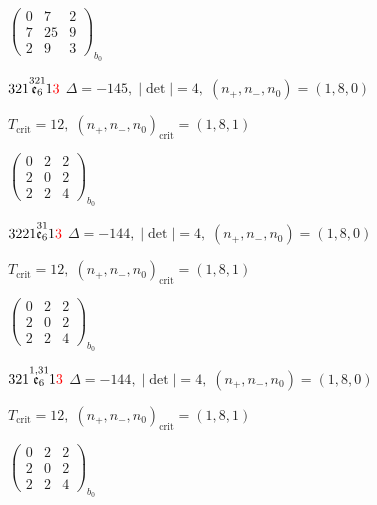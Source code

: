 \documentclass[10pt]{article}
\begin{document}
\hspace{2em}$\left(\begin{smallmatrix}0 & 7 & 2 \\ 7 & 25 & 9 \\ 2 & 9 & 3\end{smallmatrix}\right)_{\!b_0}$

\smallskip

$321\overset{321}{\mathfrak{e}_6}1\textcolor{red}{3}$ \quad $\Delta=-145,\; |\det|=4,\; (n_+,n_-,n_0)=(1,8,0)$

\hspace{1em}$T_{\text{crit}}=12,\; (n_+,n_-,n_0)_{\text{crit}}=(1,8,1)$

\hspace{2em}$\left(\begin{smallmatrix}0 & 2 & 2 \\ 2 & 0 & 2 \\ 2 & 2 & 4\end{smallmatrix}\right)_{\!b_0}$

\smallskip

$3221\overset{31}{\mathfrak{e}_6}1\textcolor{red}{3}$ \quad $\Delta=-144,\; |\det|=4,\; (n_+,n_-,n_0)=(1,8,0)$

\hspace{1em}$T_{\text{crit}}=12,\; (n_+,n_-,n_0)_{\text{crit}}=(1,8,1)$

\hspace{2em}$\left(\begin{smallmatrix}0 & 2 & 2 \\ 2 & 0 & 2 \\ 2 & 2 & 4\end{smallmatrix}\right)_{\!b_0}$

\smallskip

$321\overset{1,31}{\mathfrak{e}_6}1\textcolor{red}{3}$ \quad $\Delta=-144,\; |\det|=4,\; (n_+,n_-,n_0)=(1,8,0)$

\hspace{1em}$T_{\text{crit}}=12,\; (n_+,n_-,n_0)_{\text{crit}}=(1,8,1)$

\hspace{2em}$\left(\begin{smallmatrix}0 & 2 & 2 \\ 2 & 0 & 2 \\ 2 & 2 & 4\end{smallmatrix}\right)_{\!b_0}$
\end{document}
